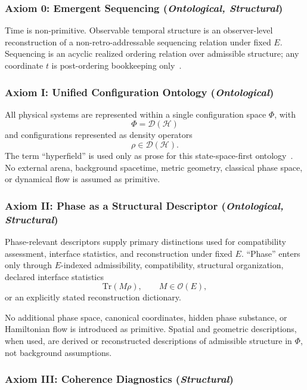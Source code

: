 \documentclass[aps,prx,onecolumn,11pt]{revtex4-2}
\theoremstyle{plain}
\theoremstyle{definition}
\theoremstyle{remark}
\begin{document}
\subsubsection*{Axiom 0: Emergent Sequencing
\;(\textit{Ontological, Structural})}
\label{ax:sequencing}

Time is non-primitive. Observable temporal structure is an
observer-level reconstruction of a non-retro-addressable sequencing
relation under fixed \(E\). Sequencing is an acyclic realized ordering
relation over admissible structure; any coordinate \(t\) is
post-ordering bookkeeping only~\cite{PageWootters1983,Rovelli1991,GambiniPullin2007}.

\subsubsection*{Axiom I: Unified Configuration Ontology
\;(\textit{Ontological})}
\label{ax:unified_config_ontology}

All physical systems are represented within a single configuration
space \(\Phi\), with
\[
\Phi=\mathcal{D}(\mathcal{H})
\]
and configurations represented as density operators
\[
\rho\in\mathcal{D}(\mathcal{H}).
\]
The term ``hyperfield'' is used only as prose for this
state-space-first ontology~\cite{Watrous2018}. No external arena,
background spacetime, metric geometry, classical phase space, or
dynamical flow is assumed as primitive.

\subsubsection*{Axiom II: Phase as a Structural Descriptor
\;(\textit{Ontological, Structural})}
\label{ax:phase_fundamental_descriptor}

Phase-relevant descriptors supply primary distinctions used for
compatibility assessment, interface statistics, and reconstruction under
fixed \(E\). ``Phase'' enters only through \(E\)-indexed admissibility,
compatibility, structural organization, declared interface statistics
\[
\mathrm{Tr}(M\rho),
\qquad
M\in\mathcal{O}(E),
\]
or an explicitly stated reconstruction dictionary.

No additional phase space, canonical coordinates, hidden phase
substance, or Hamiltonian flow is introduced as primitive. Spatial and
geometric descriptions, when used, are derived or reconstructed
descriptions of admissible structure in \(\Phi\), not background
assumptions.

\subsubsection*{Axiom III: Coherence Diagnostics
\;(\textit{Structural})}
\label{ax:coherence_diagnostics}
\end{document}
